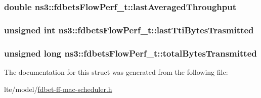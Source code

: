 \subsubsection[{\texorpdfstring{last\+Averaged\+Throughput}{lastAveragedThroughput}}]{\setlength{\rightskip}{0pt plus 5cm}double ns3\+::fdbets\+Flow\+Perf\+\_\+t\+::last\+Averaged\+Throughput}\hypertarget{structns3_1_1fdbetsFlowPerf__t_a85438df6d0de2b768527573b594f7acf}{}\label{structns3_1_1fdbetsFlowPerf__t_a85438df6d0de2b768527573b594f7acf}
\subsubsection[{\texorpdfstring{last\+Tti\+Bytes\+Trasmitted}{lastTtiBytesTrasmitted}}]{\setlength{\rightskip}{0pt plus 5cm}unsigned int ns3\+::fdbets\+Flow\+Perf\+\_\+t\+::last\+Tti\+Bytes\+Trasmitted}\hypertarget{structns3_1_1fdbetsFlowPerf__t_a64b151a181370ae120be35bafd09caf7}{}\label{structns3_1_1fdbetsFlowPerf__t_a64b151a181370ae120be35bafd09caf7}
\subsubsection[{\texorpdfstring{total\+Bytes\+Transmitted}{totalBytesTransmitted}}]{\setlength{\rightskip}{0pt plus 5cm}unsigned {\bf long} ns3\+::fdbets\+Flow\+Perf\+\_\+t\+::total\+Bytes\+Transmitted}\hypertarget{structns3_1_1fdbetsFlowPerf__t_abccf7582efedfe0362b0aed55d4d740d}{}\label{structns3_1_1fdbetsFlowPerf__t_abccf7582efedfe0362b0aed55d4d740d}


The documentation for this struct was generated from the following file\+:\begin{DoxyCompactItemize}
\item 
lte/model/\hyperlink{fdbet-ff-mac-scheduler_8h}{fdbet-\/ff-\/mac-\/scheduler.\+h}\end{DoxyCompactItemize}
